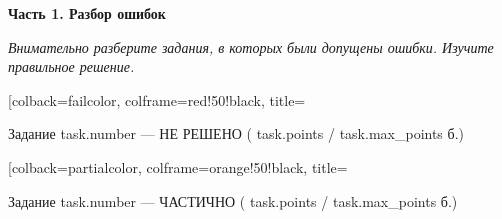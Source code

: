 \documentclass[12pt,{{ page_format|lower }}]{article}
\begin{document}
{%
{\Large\bfseries Часть 1. Разбор ошибок}

\vspace{0.3cm}
{\small\textit{Внимательно разберите задания, в которых были допущены ошибки.
Изучите правильное решение.}}
\vspace{0.3cm}

{%

{%
\begin{tcolorbox}[colback=failcolor, colframe=red!50!black, title={Задание {{ task.number }} — НЕ РЕШЕНО ({{ task.points }}/{{ task.max_points }} б.) {%
{%
\begin{tcolorbox}[colback=partialcolor, colframe=orange!50!black, title={Задание {{ task.number }} — ЧАСТИЧНО ({{ task.points }}/{{ task.max_points }} б.) {%
{%

\vspace{0.3cm}

{%

\newpage
{%

}}}}}
\end{tcolorbox}}}}
\end{tcolorbox}}}}
\end{document}
